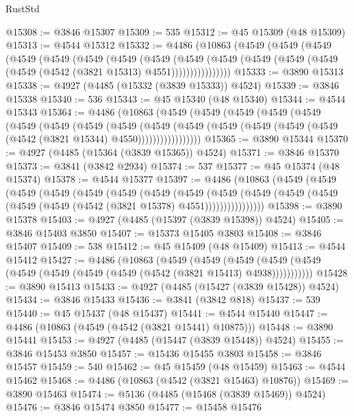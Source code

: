 \begin{lexlean}{RustStd}
\begin{coremodule}
@15308 := @3846 @15307
@15309 := 535
@15312 := @45 @15309 (@48 @15309)
@15313 := @4544 @15312
@15332 := @4486
    (@10863
      (@4549
        (@4549
          (@4549
            (@4549
              (@4549
                (@4549
                  (@4549
                    (@4549
                      (@4549
                        (@4549
                          (@4549 (@4549 (@4549 (@4549 (@4542 (@3821 @15313) @4551))))))))))))))))
@15333 := @3890 @15313
@15338 := @4927 (@4485 (@15332 (@3839 @15333)) @4524)
@15339 := @3846 @15338
@15340 := 536
@15343 := @45 @15340 (@48 @15340)
@15344 := @4544 @15343
@15364 := @4486
    (@10863
      (@4549
        (@4549
          (@4549
            (@4549
              (@4549
                (@4549
                  (@4549
                    (@4549
                      (@4549
                        (@4549
                          (@4549
                            (@4549 (@4549 (@4549 (@4549 (@4542 (@3821 @15344) @4550)))))))))))))))))
@15365 := @3890 @15344
@15370 := @4927 (@4485 (@15364 (@3839 @15365)) @4524)
@15371 := @3846 @15370
@15373 := @3841 (@3842 @2934)
@15374 := 537
@15377 := @45 @15374 (@48 @15374)
@15378 := @4544 @15377
@15397 := @4486
    (@10863
      (@4549
        (@4549
          (@4549
            (@4549
              (@4549
                (@4549
                  (@4549
                    (@4549
                      (@4549
                        (@4549
                          (@4549 (@4549 (@4549 (@4549 (@4542 (@3821 @15378) @4551))))))))))))))))
@15398 := @3890 @15378
@15403 := @4927 (@4485 (@15397 (@3839 @15398)) @4524)
@15405 := @3846 @15403 @3850
@15407 := @15373 @15405 @3803
@15408 := @3846 @15407
@15409 := 538
@15412 := @45 @15409 (@48 @15409)
@15413 := @4544 @15412
@15427 := @4486
    (@10863
      (@4549
        (@4549
          (@4549 (@4549 (@4549 (@4549 (@4549 (@4549 (@4549 (@4542 (@3821 @15413) @4938)))))))))))
@15428 := @3890 @15413
@15433 := @4927 (@4485 (@15427 (@3839 @15428)) @4524)
@15434 := @3846 @15433
@15436 := @3841 (@3842 @818)
@15437 := 539
@15440 := @45 @15437 (@48 @15437)
@15441 := @4544 @15440
@15447 := @4486 (@10863 (@4549 (@4542 (@3821 @15441) @10875)))
@15448 := @3890 @15441
@15453 := @4927 (@4485 (@15447 (@3839 @15448)) @4524)
@15455 := @3846 @15453 @3850
@15457 := @15436 @15455 @3803
@15458 := @3846 @15457
@15459 := 540
@15462 := @45 @15459 (@48 @15459)
@15463 := @4544 @15462
@15468 := @4486 (@10863 (@4542 (@3821 @15463) @10876))
@15469 := @3890 @15463
@15474 := @5136 (@4485 (@15468 (@3839 @15469)) @4524)
@15476 := @3846 @15474 @3850
@15477 := @15458 @15476

\end{coremodule}
\end{lexlean}
